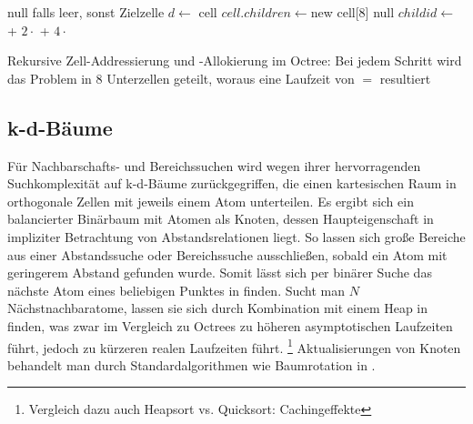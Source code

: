 \begin{algorithm}
  \begin{algorithmic}
    \Result null falls leer, sonst Zielzelle
    \State
    \State $d \gets $
    \State\Return cell
    \EndIf
    \State $cell.children \gets $new cell[8]
    \Else
    \State \Return null
    \EndIf
    \EndIf
    \State $childid \gets $
    + $2\cdot$
    + $4\cdot$
    \State \Return{}
    \EndFunction
  \end{algorithmic}
  \caption[Zell-Addressierung in Octrees]{Rekursive Zell-Addressierung und -Allokierung im Octree: Bei jedem Schritt wird das Problem in 8 Unterzellen geteilt, woraus eine Laufzeit von $=$ resultiert}
  \label{algo:octreeaddressing}
\end{algorithm}


\subsection{k-d-Bäume}
\label{datakdtree}

Für Nachbarschafts- und Bereichssuchen wird wegen ihrer hervorragenden Suchkomplexität auf k-d-Bäume zurückgegriffen, die einen kartesischen Raum in orthogonale Zellen mit jeweils einem Atom unterteilen.
Es ergibt sich ein balancierter Binärbaum mit Atomen als Knoten, dessen Haupteigenschaft in impliziter Betrachtung von Abstandsrelationen liegt.
So lassen sich große Bereiche aus einer Abstandssuche oder Bereichssuche ausschließen, sobald ein Atom mit geringerem Abstand gefunden wurde.
Somit lässt sich per binärer Suche das nächste Atom eines beliebigen Punktes in  finden.
Sucht man $N$ Nächstnachbaratome, lassen sie sich durch Kombination mit einem Heap in  finden, was zwar im Vergleich zu Octrees zu höheren asymptotischen Laufzeiten führt, jedoch zu kürzeren realen Laufzeiten führt.
\footnote{Vergleich dazu auch Heapsort vs. Quicksort: Cachingeffekte}
Aktualisierungen von Knoten behandelt man durch Standardalgorithmen wie Baumrotation in .

